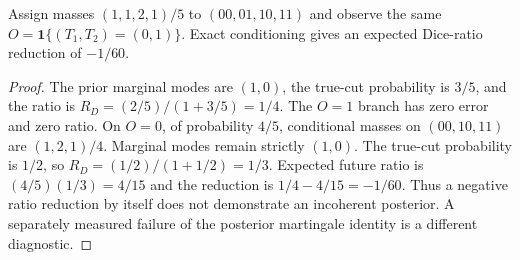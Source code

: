\begin{counterexample}
Assign masses $(1,1,2,1)/5$ to $(00,01,10,11)$ and observe the same
$O=\mathbf{1}\{(T_1,T_2)=(0,1)\}$. Exact conditioning gives an expected
Dice-ratio reduction of $-1/60$.
\end{counterexample}
\begin{proof}
The prior marginal modes are $(1,0)$, the true-cut probability is $3/5$,
and the ratio is
$R_D=(2/5)/(1+3/5)=1/4$.
The $O=1$ branch has zero error and zero ratio.
On $O=0$, of probability $4/5$, conditional masses on $(00,10,11)$
are $(1,2,1)/4$. Marginal modes remain strictly $(1,0)$.
The true-cut probability is $1/2$, so
$R_D=(1/2)/(1+1/2)=1/3$.
Expected future ratio is $(4/5)(1/3)=4/15$ and the reduction is
$1/4-4/15=-1/60$.
Thus a negative ratio reduction by itself does not demonstrate an
incoherent posterior. A separately measured failure of the posterior
martingale identity is a different diagnostic.
\end{proof}
